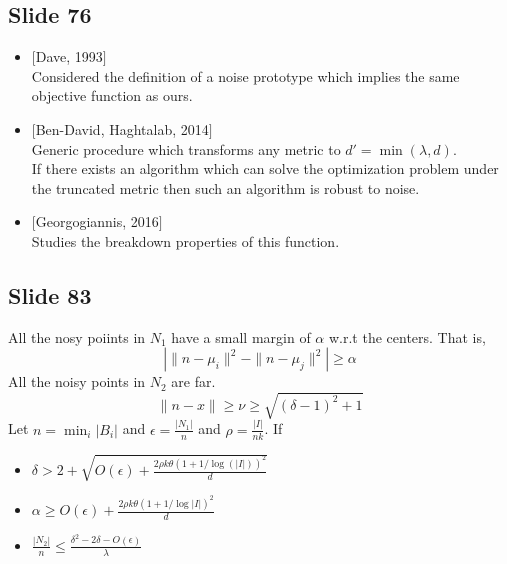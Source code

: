 \documentclass[12pt]{article}
\begin{document}
\subsection*{Slide 76}
\begin{itemize}
	\item $[$Dave, 1993$]$\\
	Considered the definition of a noise prototype which implies the same objective function as ours.
	\item $[$Ben-David, Haghtalab, 2014$]$\\
	Generic procedure which transforms any metric to $d' = \min(\lambda, d)$.\\
	If there exists an algorithm which can solve the optimization problem under the truncated metric then such an algorithm is robust to noise. 		\item $[$Georgogiannis, 2016$]$\\
	Studies the breakdown properties of this function.
\end{itemize}

\subsection*{Slide 83}
All the nosy poiints in $N_1$ have a small margin of $\alpha$ w.r.t the centers. That is,
$$| \|n-\mu_i\|^2 - \|n-\mu_j\|^2| \ge \alpha$$
All the noisy points in $N_2$ are far. 
$$ \|n- x\| \ge \nu \ge \sqrt{(\delta-1)^2+1}$$ Let $n = \min_i |B_i|$ and $\epsilon = \frac{| N_1|}{n}$ and $\rho = \frac{|I|}{nk}$. If  

\begin{itemize}
  \item $\delta > 2 + \sqrt{ O(\epsilon) + \frac{2\rho k\theta(1+1/\log(|I|))^2}{d}}$ 
  \item $\alpha \ge O(\epsilon)+ \frac{2\rho k\theta(1+1/\log|I|)^2}{d}$ 
  \item $\frac{|N_2|}{n} \le \frac{\delta^2-2\delta-O(\epsilon)}{\lambda}$
\end{itemize}
\end{document}
